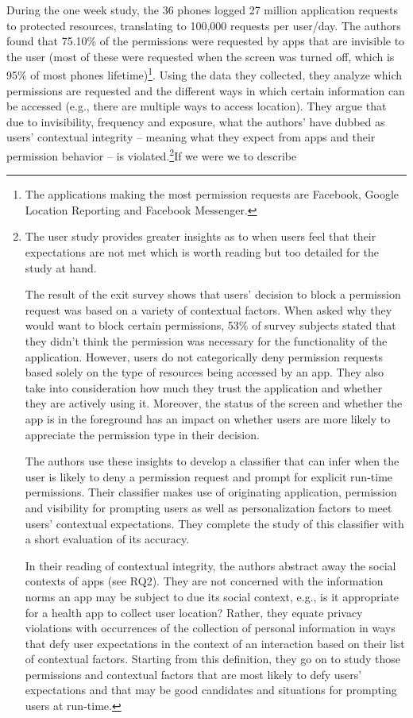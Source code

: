 \documentclass[../thesis.tex]{subfiles}
\begin{document}
During the one week study, the 36 phones logged 27 million application
requests to protected resources, translating to 100,000 requests per
user/day. The authors found that 75.10\% of the permissions were
requested by apps that are invisible to the user (most of these were
requested when the screen was turned off, which is 95\% of most phones
lifetime)\footnote{ The applications making the most permission
requests are Facebook, Google Location Reporting and Facebook
Messenger.}. Using the data they collected, they analyze which
permissions are requested and the different ways in which certain
information can be accessed (e.g., there are multiple ways to access
location). They argue that due to invisibility, frequency and exposure,
what the authors' have dubbed as users'
contextual integrity -- meaning what they expect from apps and their
permission behavior -- is violated.\footnote{
The user study provides greater insights
as to when users feel that their expectations are not met which is
worth reading but too detailed for the study at hand. 

The result of the exit survey shows that
users' decision to block a permission request was based
on a variety of contextual factors. When asked why they would want to
block certain permissions, 53\% of survey subjects stated that they
didn't think the permission was necessary for the
functionality of the application. However,
users do not categorically deny permission
requests based solely on the type of resources being accessed by an
app. They also take into consideration how much they trust the
application and whether they are actively using it. Moreover, the
status of the screen and whether the app is in the foreground has an
impact on whether users are more likely to appreciate the permission
type in their decision.

The authors use these insights to develop a
classifier that can infer when the user is likely to deny a permission
request and prompt for explicit run-time permissions. Their classifier
makes use of originating application, permission and visibility for
prompting users as well as personalization factors to meet
users' contextual expectations. They complete the study
of this classifier with a short evaluation of its accuracy.

In their reading of contextual integrity,
the authors abstract away the social contexts of apps (see RQ2). They are
not concerned with the information norms an app may be subject to due
its social context, e.g., is it appropriate for a health app to collect
user location? Rather, they equate privacy violations with occurrences
of the collection of personal information in ways that defy user
expectations in the context of an interaction based on their list of
contextual factors. Starting from this definition, they go on to study
those permissions and contextual factors that are most likely to defy
users' expectations and that may be good candidates and
situations for prompting users at run-time. }If we were we to describe
\end{document}
